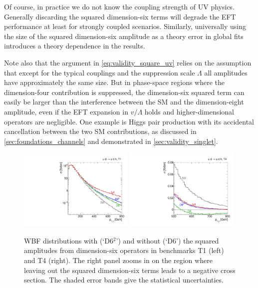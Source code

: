 Of course, in practice we do not know the coupling strength of UV
physics. Generally discarding the squared dimension-six terms will
degrade the EFT performance at least for strongly coupled
scenarios. Similarly, universally using the size of the squared
dimension-six amplitude as a theory error in global fits introduces a
theory dependence in the results.

Note also that the argument in \autoref{eq:validity_square_uv} relies
on the assumption that except for the typical couplings and the
suppression scale $\Lambda$ all amplitudes have approximately the same
size. But in phase-space regions where the dimension-four contribution
is suppressed, the dimension-six squared term can easily be larger
than the interference between the SM and the dimension-eight amplitude, even if
the EFT expansion in $v/\Lambda$ holds and higher-dimensional
operators are negligible. One example is Higgs pair production with
its accidental cancellation between the two SM contributions, as
discussed in \autoref{sec:foundations_channels} and demonstrated in
\ref{sec:validity_singlet}.

\begin{figure}
  \includegraphics[width=0.49\textwidth,clip=true,trim=0 0.2cm 0 0.2cm]{fig/validity/WBF_T1_j1pt.pdf}%
  \includegraphics[width=0.49\textwidth,clip=true,trim=0 0.2cm 0 0.2cm]{fig/validity/WBF_T4_j1pt_zoom.pdf}%
  \caption{WBF distributions with (`D6$^{2}$') and without (`D6') the
    squared amplitudes from dimension-six operators in benchmarks T1
    (left) and T4 (right). The right panel zooms in on the region
    where leaving out the squared dimension-six terms leads to a
    negative cross section. The shaded error bands give the
    statistical uncertainties.}
  \label{fig:validity_squared}
\end{figure}

